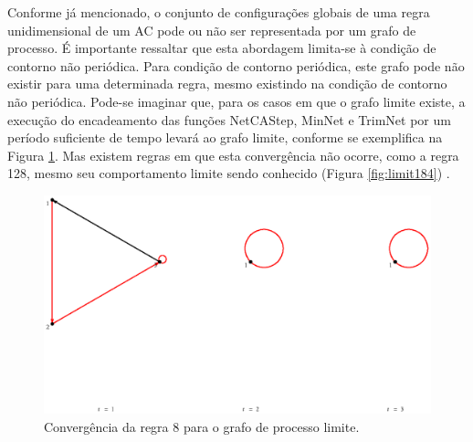 \documentclass[12pt,a4paper]{article}
\begin{document}
Conforme já mencionado, o conjunto de configurações globais de uma regra
unidimensional de um AC pode ou não ser representada por um grafo de
processo. É importante ressaltar que esta abordagem limita-se à condição
de contorno não periódica. Para condição de contorno periódica, este grafo
pode não existir para uma determinada regra, mesmo existindo na condição de
contorno não periódica. Pode-se imaginar que, para os casos em que o grafo
limite existe, a execução do encadeamento das funções NetCAStep, MinNet e
TrimNet por um período suficiente de tempo levará ao grafo limite, conforme
se exemplifica na Figura \ref{fig:r8t}. Mas existem regras em que esta
convergência não ocorre, como a regra 128, mesmo seu comportamento limite
sendo conhecido (Figura \ref{fig:limit184}) .

\begin{figure}[htp]
\begin{center}
\includegraphics[scale=1.0]{img/Rule8.eps}
\caption{Convergência da regra 8 para o grafo de processo limite.}
\label{fig:r8t}
\end{center}
\end{figure}
\end{document}
